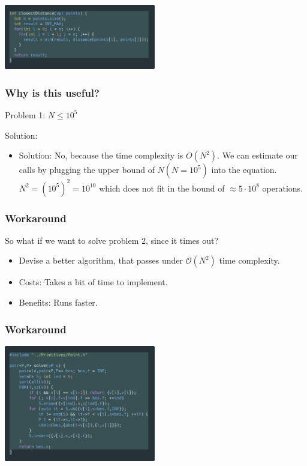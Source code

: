 \documentclass{beamer}
\begin{document}
\begin{frame}
	\includegraphics[width=250px]{closestpaireasy.png}
\end{frame}

\begin{frame}
	\frametitle{Why is this useful?}

	Problem 1: $N \leq 10^5$

	Solution:

	\begin{itemize}
		\item<2-> Solution: No, because the time complexity is $O(N^2)$.
		We can estimate our calls by plugging the upper bound of $N(N = 10^5)$
		into the equation. $N^2 = (10^5)^2 = 10^10$ which does not fit in the bound
		of $\approx 5\cdot 10^8$ operations.
	\end{itemize}
\end{frame}

\begin{frame}
	\frametitle{Workaround}
	So what if we want to solve problem 2, since it times out?
	\begin{itemize}
		\item Devise a better algorithm, that passes under $\mathcal{O}(N^2)$
		time complexity.
		\item Costs: Takes a bit of time to implement.
		\item Benefits: Runs faster.
	\end{itemize}
\end{frame}

\begin{frame}
	\frametitle{Workaround}
	\includegraphics[width=250px]{closestpair.png}
\end{frame}
\end{document}
